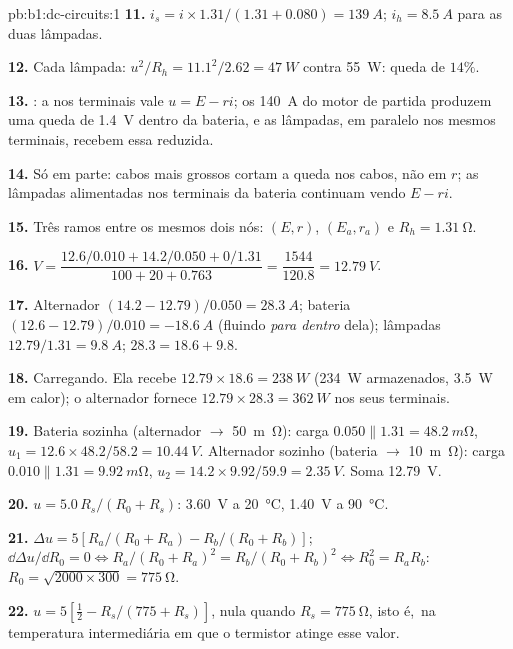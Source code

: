 \begin{solution}{pb:b1:dc-circuits:1}
\textbf{11.} $i_s = i \times 1.31/(1.31 + 0.080) = \qty{139}{A}$; $i_h =
\qty{8.5}{A}$ para as duas lâmpadas.

\textbf{12.} Cada lâmpada: $u^2/R_h = 11.1^2/2.62 = \qty{47}{W}$ contra
\qty{55}{W}: queda de $14\%$.

\textbf{13.} : a  nos terminais vale $u = E - ri$; os
\qty{140}{A} do motor de partida produzem uma queda de \qty{1.4}{V} dentro da bateria,
e as lâmpadas, em paralelo nos mesmos terminais, recebem essa 
reduzida.

\textbf{14.} Só em parte: cabos mais grossos cortam a queda nos cabos,
não em $r$; as lâmpadas alimentadas nos terminais da bateria continuam vendo $E - ri$.

\textbf{15.} Três ramos entre os mesmos dois nós: $(E, r)$,
$(E_a, r_a)$ e $R_h = \qty{1.31}{\ohm}$.

\textbf{16.} $V = \dfrac{12.6/0.010 + 14.2/0.050 + 0/1.31}{100 + 20 + 0.763}
= \dfrac{1544}{120.8} = \qty{12.79}{V}$.

\textbf{17.} Alternador $(14.2 - 12.79)/0.050 = \qty{28.3}{A}$; bateria
$(12.6 - 12.79)/0.010 = \qty{-18.6}{A}$ (fluindo \emph{para dentro} dela); lâmpadas
$12.79/1.31 = \qty{9.8}{A}$; $28.3 = 18.6 + 9.8$.

\textbf{18.} Carregando. Ela recebe $12.79 \times 18.6 = \qty{238}{W}$
(\qty{234}{W} armazenados, \qty{3.5}{W} em calor); o alternador fornece
$12.79 \times 28.3 = \qty{362}{W}$ nos seus terminais.

\textbf{19.} Bateria sozinha (alternador $\to$ \qty{50}{m\ohm}): carga
$0.050 \parallel 1.31 = \qty{48.2}{m\ohm}$, $u_1 = 12.6 \times 48.2/58.2 =
\qty{10.44}{V}$. Alternador sozinho (bateria $\to$ \qty{10}{m\ohm}): carga
$0.010 \parallel 1.31 = \qty{9.92}{m\ohm}$, $u_2 = 14.2 \times 9.92/59.9 =
\qty{2.35}{V}$. Soma \qty{12.79}{V}.

\textbf{20.} $u = 5.0\,R_s/(R_0 + R_s)$: \qty{3.60}{V} a
\qty{20}{\degreeCelsius}, \qty{1.40}{V} a \qty{90}{\degreeCelsius}.

\textbf{21.} $\Delta u = 5[R_a/(R_0 + R_a) - R_b/(R_0 + R_b)]$;
$\dd\Delta u/\dd R_0 = 0 \Leftrightarrow R_a/(R_0 + R_a)^2 = R_b/(R_0 +
R_b)^2 \Leftrightarrow R_0^2 = R_aR_b$: $R_0 = \sqrt{2000 \times 300} =
\qty{775}{\ohm}$.

\textbf{22.} $u = 5[\tfrac12 - R_s/(775 + R_s)]$, nula quando $R_s =
\qty{775}{\ohm}$, isto é,\ na temperatura intermediária em que o
termistor atinge esse valor.


\end{solution}
